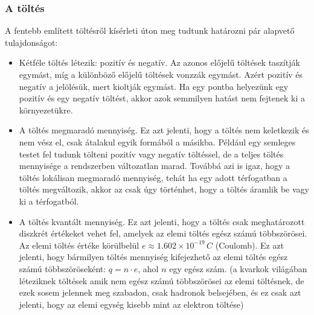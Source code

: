\documentclass[a4paper,12pt]{article}
\begin{document}
\subsubsection{A töltés}
A fentebb említett töltésről kísérleti úton meg tudtunk határozni pár alapvető tulajdonságot:
\begin{itemize}
    \item Kétféle töltés létezik: pozitív és negatív. Az azonos előjelű töltések taszítják egymást, míg a különböző előjelű töltések vonzzák egymást. Azért pozitív és negatív a jelölésük, mert kioltják egymást. Ha egy pontba helyezünk egy pozitív és egy negatív töltést, akkor azok semmilyen hatást nem fejtenek ki a környezetükre.
    \item A töltés megmaradó mennyiség. Ez azt jelenti, hogy a töltés nem keletkezik és nem vész el, csak átalakul egyik formából a másikba. Például egy semleges testet fel tudunk tölteni pozitív vagy negatív töltéssel, de a teljes töltés mennyisége a rendszerben változatlan marad. Továbbá azi is igaz, hogy a töltés lokálisan megmaradó mennyiség, tehát ha egy adott térfogatban a töltés megváltozik, akkor az csak úgy történhet, hogy a töltés áramlik be vagy ki a térfogatból.
    \item A töltés kvantált mennyiség. Ez azt jelenti, hogy a töltés csak meghatározott diszkrét értékeket vehet fel, amelyek az elemi töltés egész számú többszörösei. Az elemi töltés értéke körülbelül $e \approx 1.602 \times 10^{-19} \, C$ (Coulomb). Ez azt jelenti, hogy bármilyen töltés mennyiség kifejezhető az elemi töltés egész számú többszöröseként: $q = n \cdot e$, ahol $n$ egy egész szám. (a kvarkok világában léteziknek töltések amik nem egész számú többszörösei az elemi töltésnek, de ezek sosem jelennek meg szabadon, csak hadronok belsejében, és ez csak azt jelenti, hogy az elemi egység kisebb mint az elektron töltése)
\end{itemize}
\end{document}

